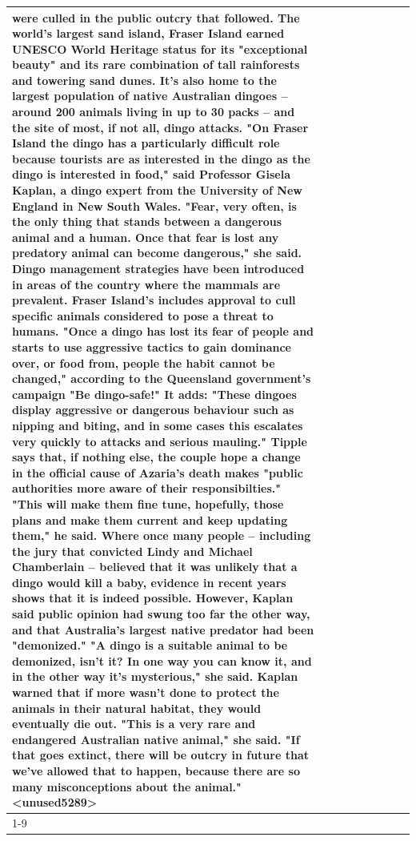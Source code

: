 \begin{table}[H]
\begin{tabular}{lllrlllll}
were culled in the public outcry that followed. The world's largest sand island, Fraser Island earned UNESCO World Heritage status for its "exceptional beauty" and its rare combination of tall rainforests and towering sand dunes. It's also home to the largest population of native Australian dingoes -- around 200 animals living in up to 30 packs -- and the site of most, if not all, dingo attacks. "On Fraser Island the dingo has a particularly difficult role because tourists are as interested in the dingo as the dingo is interested in food," said Professor Gisela Kaplan, a dingo expert from the University of New England in New South Wales. "Fear, very often, is the only thing that stands between a dangerous animal and a human. Once that fear is lost any predatory animal can become dangerous," she said. Dingo management strategies have been introduced in areas of the country where the mammals are prevalent. Fraser Island's includes approval to cull specific animals considered to pose a threat to humans. "Once a dingo has lost its fear of people and starts to use aggressive tactics to gain dominance over, or food from, people the habit cannot be changed," according to the Queensland government's campaign "Be dingo-safe!" It adds: "These dingoes display aggressive or dangerous behaviour such as nipping and biting, and in some cases this escalates very quickly to attacks and serious mauling." Tipple says that, if nothing else, the couple hope a change in the official cause of Azaria's death makes "public authorities more aware of their responsibilties." "This will make them fine tune, hopefully, those plans and make them current and keep updating them," he said. Where once many people -- including the jury that convicted Lindy and Michael Chamberlain -- believed that it was unlikely that a dingo would kill a baby, evidence in recent years shows that it is indeed possible. However, Kaplan said public opinion had swung too far the other way, and that Australia's largest native predator had been "demonized." "A dingo is a suitable animal to be demonized, isn't it? In one way you can know it, and in the other way it's mysterious," she said. Kaplan warned that if more wasn't done to protect the animals in their natural habitat, they would eventually die out. "This is a very rare and endangered Australian native animal," she said. "If that goes extinct, there will be outcry in future that we've allowed that to happen, because there are so many misconceptions about the animal."<unused5289> \\
\cline{1-9}

\end{tabular}
\end{table}
